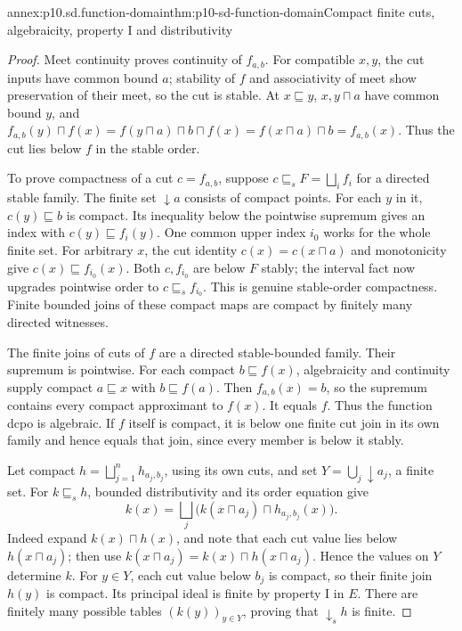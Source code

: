 \begin{annexitem}{annex:p10.sd.function-domain}{thm:p10-sd-function-domain}{Compact finite cuts, algebraicity, property I and distributivity}
\begin{proof}
Meet continuity proves continuity of \(f_{a,b}\). For compatible
\(x,y\), the cut inputs have common bound \(a\); stability of \(f\)
and associativity of meet show preservation of their meet, so the cut
is stable. At \(x\sqsubseteq y\), \(x,y\sqcap a\) have common bound
\(y\), and
\(f_{a,b}(y)\sqcap f(x)=f(y\sqcap a)\sqcap b\sqcap f(x)
=f(x\sqcap a)\sqcap b=f_{a,b}(x)\).
Thus the cut lies below \(f\) in the stable order.

To prove compactness of a cut \(c=f_{a,b}\), suppose
\(c\sqsubseteq_s F=\bigsqcup_i f_i\) for a directed stable family.
The finite set \(\downarrow a\) consists of compact points.
For each \(y\) in it, \(c(y)\sqsubseteq b\) is compact. Its inequality
below the pointwise supremum gives an index with \(c(y)\sqsubseteq f_i(y)\).
One common upper index \(i_0\) works for the whole finite set.
For arbitrary \(x\), the cut identity \(c(x)=c(x\sqcap a)\)
and monotonicity give \(c(x)\sqsubseteq f_{i_0}(x)\).
Both \(c,f_{i_0}\) are below \(F\) stably; the interval fact now
upgrades pointwise order to \(c\sqsubseteq_s f_{i_0}\).
This is genuine stable-order compactness. Finite bounded joins of these
compact maps are compact by finitely many directed witnesses.

The finite joins of cuts of \(f\) are a directed stable-bounded family.
Their supremum is pointwise. For each compact \(b\sqsubseteq f(x)\),
algebraicity and continuity supply compact \(a\sqsubseteq x\) with
\(b\sqsubseteq f(a)\). Then \(f_{a,b}(x)=b\), so the supremum
contains every compact approximant to \(f(x)\). It equals \(f\).
Thus the function dcpo is algebraic. If \(f\) itself is compact, it
is below one finite cut join in its own family and hence equals that
join, since every member is below it stably.

Let compact \(h=\bigsqcup_{j=1}^n h_{a_j,b_j}\), using its own cuts,
and set \(Y=\bigcup_j\downarrow a_j\), a finite set. For
\(k\sqsubseteq_s h\), bounded distributivity and its order equation give
\[
 k(x)=\bigsqcup_j\bigl(k(x\sqcap a_j)\sqcap h_{a_j,b_j}(x)\bigr).
\]
Indeed expand \(k(x)\sqcap h(x)\), and note that each cut value lies
below \(h(x\sqcap a_j)\); then use
\(k(x\sqcap a_j)=k(x)\sqcap h(x\sqcap a_j)\).
Hence the values on \(Y\) determine \(k\). For \(y\in Y\), each
cut value below \(b_j\) is compact, so their finite join \(h(y)\)
is compact. Its principal ideal is finite by property I in \(E\).
There are finitely many possible tables \((k(y))_{y\in Y}\), proving
that \(\downarrow_s h\) is finite.


\end{proof}
\end{annexitem}
